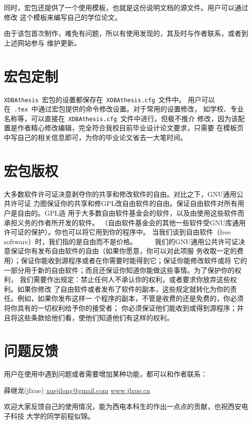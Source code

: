同时，宏包还提供了一个使用模板，也就是这份说明文档的源文件。用户可以通过修改
这个模板来编写自己的学位论文。

由于该包首次制作，难免有问题，所以有使用发现的，其及时与作者联系，或者到上述网站参与
维护更新。


\section{宏包定制}

\texttt{XDBAthesis}~宏包的设置都保存在~\texttt{XDBAthesis.cfg}~文件中。
用户可以在~\texttt{.tex}~中通过宏包提供的命令修改设置。对于常用的设置修改，
如学校、专业名称等，可以直接在~\texttt{XDBAthesis.cfg}~文件中进行。但极不推介
修改，因为该配置是作者精心修改编辑，完全符合我校目前毕业设计论文要求，只需要
在模板页中写自己的相关信息即可，为你的毕业论文省去一大笔时间。

\section{宏包版权}
大多数软件许可证决意剥夺你的共享和修改软件的自由。对比之下，GNU通用公共许可证
力图保证你的共享和修GPL改自由软件的自由。保证自由软件对所有用户是自由的。GPL适
用于大多数自由软件基金会的软件，以及由使用这些软件而承担义务的作者所开发的软件。
（自由软件基金会的其他一些软件受GNU库通用许可证的保护）。你也可以将它用到你的程序中。
当我们谈到自由软件（free software）时，我们指的是自由而不是价格。
　　
我们的GNU通用公共许可证决意保证你有发布自由软件的自由（如果你愿意，你可以对此项服
务收取一定的费用）；保证你能收到源程序或者在你需要时能得到它；保证你能修改软件或将
它的一部分用于新的自由软件；而且还保证你知道你能做这些事情。为了保护你的权利，
我们需要作出规定：禁止任何人不承认你的权利，或者要求你放弃这些权利。如果你修改
了自由软件或者发布了软件的副本，这些规定就转化为你的责任。例如，如果你发布这样一
个程序的副本，不管是收费的还是免费的，你必须将你具有的一切权利给予你的接受者；
你必须保证他们能收到或得到源程序；并且将这些条款给他们看，使他们知道他们有这样的权利。

\section{问题反馈}

用户在使用中遇到问题或者需要增加某种功能，都可以和作者联系：

\begin{center}
薛继龙(jlxue) \quad \href{mailto:xuejilong@gmail.com}{xuejilong@gmail.com}\quad
\href{www.jlxue.cn}{www.jlxue.cn}
\end{center}

欢迎大家反馈自己的使用情况，能为西电本科生的作出一点点的贡献，也祝西安电子科技
大学的同学前程似锦。
